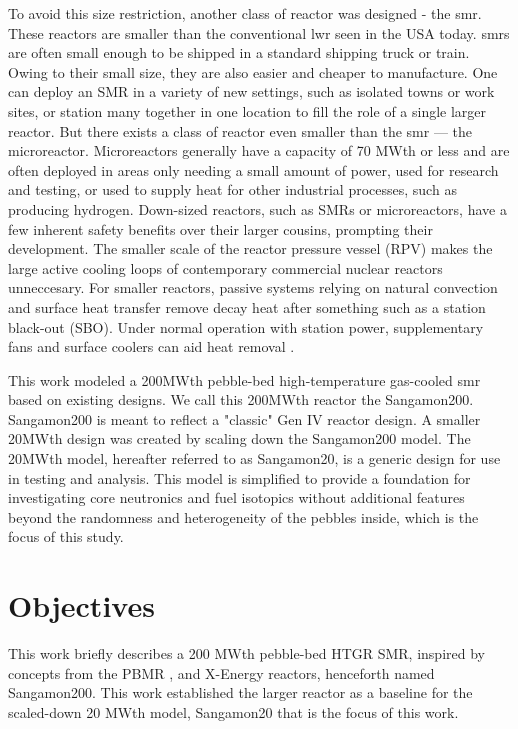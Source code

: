 To avoid this size restriction, another class of reactor was designed - the \acrfull{smr}.  These reactors are smaller than the conventional \acrshort{lwr} seen in the USA today.  \acrshort{smr}s are often small enough to be shipped in a standard shipping truck or train.  Owing to their small size, they are also easier and cheaper to manufacture.  One can deploy an SMR in a variety of new settings, such as isolated towns or work sites, or station many together in one location to fill the role of a single larger reactor.  But there exists a class of reactor even smaller than the \acrshort{smr} --- the microreactor.  Microreactors generally have a capacity of 70 MWth or less and are often deployed in areas only needing a small amount of power, used for research and testing, or used to supply heat for other industrial processes, such as producing hydrogen.  Down-sized reactors, such as SMRs or microreactors, have a few inherent safety benefits over their larger cousins, prompting their development.  The smaller scale of the reactor pressure vessel (RPV) makes the large active cooling loops of contemporary commercial nuclear reactors unneccesary.  For smaller reactors, passive systems relying on natural convection and surface heat transfer remove decay heat after something such as a station black-out (SBO).  Under normal operation with station power, supplementary fans and surface coolers can aid heat removal \cite{reutler_advantages_1984}.


This work modeled a 200MWth pebble-bed high-temperature gas-cooled \acrshort{smr} based on existing designs.  We call this 200MWth reactor the Sangamon200.  Sangamon200 is meant to reflect a "classic" Gen IV reactor design.  A smaller 20MWth design was created by scaling down the Sangamon200 model.  The 20MWth model, hereafter referred to as Sangamon20, is a generic design for use in testing and analysis.  This model is simplified to provide a foundation for investigating core neutronics and fuel isotopics without additional features beyond the randomness and heterogeneity of the pebbles inside, which is the focus of this study.


\section{Objectives}

This work briefly describes a 200 MWth pebble-bed HTGR SMR, inspired by concepts from the PBMR \cite{venter_pbmr_2005}, \cite{noauthor_pebble_2017} and X-Energy \cite{harlan_x-energy_2018} reactors, henceforth named Sangamon200.  This work established the larger reactor as a baseline for the scaled-down 20 MWth model, Sangamon20 that is the focus of this work.

